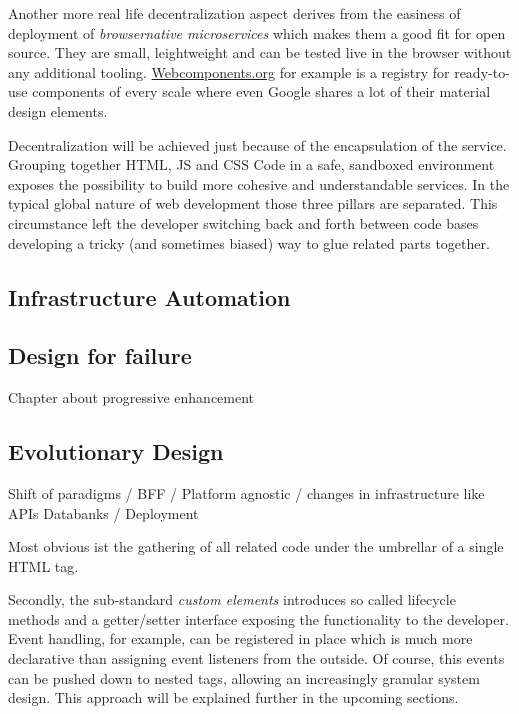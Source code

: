 \documentclass[]{assets/latex/ieee}
\begin{document}
Another more real life decentralization aspect derives from the easiness
of deployment of \emph{browsernative microservices} which makes them a
good fit for open source. They are small, leightweight and can be tested
live in the browser without any additional tooling.
\href{https://webcomponents.org}{Webcomponents.org} for example is a
registry for ready-to-use components of every scale where even Google
shares a lot of their material design elements.

Decentralization will be achieved just because of the encapsulation of
the service. Grouping together HTML, JS and CSS Code in a safe,
sandboxed environment exposes the possibility to build more cohesive and
understandable services. In the typical global nature of web development
those three pillars are separated. This circumstance left the developer
switching back and forth between code bases developing a tricky (and
sometimes biased) way to glue related parts together.

\subsection{Infrastructure Automation}\label{infrastructure-automation}

\subsection{Design for failure}\label{design-for-failure}

Chapter about progressive enhancement

\subsection{Evolutionary Design}\label{evolutionary-design}

Shift of paradigms / BFF / Platform agnostic / changes in infrastructure
like APIs Databanks / Deployment

Most obvious ist the gathering of all related code under the umbrellar
of a single HTML tag.

Secondly, the sub-standard \emph{custom elements} introduces so called
lifecycle methods and a getter/setter interface exposing the
functionality to the developer. Event handling, for example, can be
registered in place which is much more declarative than assigning event
listeners from the outside. Of course, this events can be pushed down to
nested tags, allowing an increasingly granular system design. This
approach will be explained further in the upcoming sections.
\end{document}
